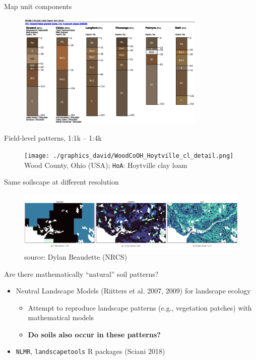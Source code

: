 \documentclass[aspectratio=169]{beamer}
\begin{document}
\begin{frame}{Map unit components}
    \begin{figure}
        \centering
\includegraphics[width=0.8\textwidth]{./graphics_david/SoilWeb_pH05_PonyHollowMoraine_MapUnits.png}
     \end{figure}
    \end{frame}

\begin{frame}{Field-level patterns, 1:1k -- 1:4k}
        \begin{figure}
        \centering
\texttt{[image: ./graphics\_david/WoodCoOH\_Hoytville\_cl\_detail.png]}\\
{Wood County, Ohio (USA); \texttt{HoA}: Hoytville clay loam}
     \end{figure}
\end{frame}

\begin{frame}{Same soilscape at different resolution}
    \begin{figure}
        \centering
        \includegraphics[width=\linewidth]{./graphics_david/Dylan_ND005-example-01.png}
\\source: Dylan Beaudette (NRCS)
    \end{figure}
\end{frame}

\begin{frame}{Are there mathematically ``natural'' soil patterns?}
\begin{itemize}
    \item Neutral Landscape Models (Riitters et al. 2007, 2009) for landscape ecology
    \begin{itemize}
        \item Attempt to reproduce landscape patterns (e.g., vegetation patches) with mathematical models
        \item \textbf{Do soils also occur in these patterns?}
    \end{itemize}
    \item \texttt{NLMR}, \texttt{landscapetools} R packages (Sciani 2018)
\end{itemize}
\end{frame}
\end{document}
